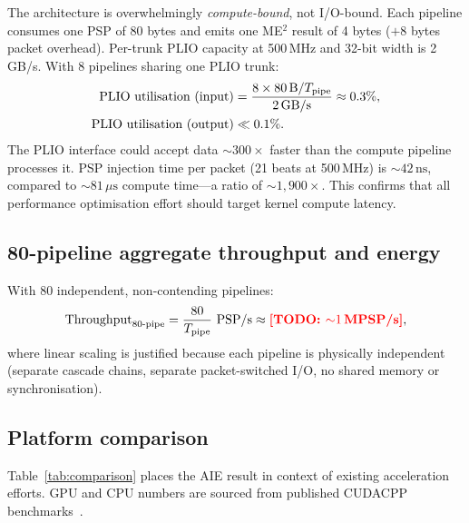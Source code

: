 The architecture is overwhelmingly \emph{compute-bound}, not I/O-bound.  Each
pipeline consumes one PSP of 80 bytes and emits one ME$^2$ result of 4 bytes
($+8$ bytes packet overhead).  Per-trunk PLIO capacity at 500\,MHz and 32-bit
width is 2\,GB/s.  With 8 pipelines sharing one PLIO trunk:
\begin{align}
  \text{PLIO utilisation (input)} &= \frac{8\times 80\,\text{B}/T_\text{pipe}}{2\,\text{GB/s}}
    \approx 0.3\%, \notag \\
  \text{PLIO utilisation (output)} &\ll 0.1\%.
\end{align}
The PLIO interface could accept data ${\sim}300\times$ faster than the
compute pipeline processes it.  PSP injection time per packet (21 beats at
500\,MHz) is ${\sim}42\,\text{ns}$, compared to ${\sim}81\,\mu\text{s}$ compute
time---a ratio of ${\sim}1{,}900\times$.  This confirms that all
performance optimisation effort should target kernel compute latency.

\subsection{80-pipeline aggregate throughput and energy}\label{sec:res_throughput}

With 80 independent, non-contending pipelines:
\begin{equation}
  \text{Throughput}_{\text{80-pipe}}
  = \frac{80}{T_\text{pipe}}\ \text{PSP/s}
  \approx \mathbf{\textcolor{red}{\textbf{[TODO: ${\sim}1\,\text{MPSP/s}$]}}},
  \label{eq:throughput}
\end{equation}
where linear scaling is justified because each pipeline is physically
independent (separate cascade chains, separate packet-switched I/O, no shared
memory or synchronisation).


\subsection{Platform comparison}\label{sec:res_comparison}

Table~\ref{tab:comparison} places the AIE result in context of
existing acceleration efforts.  GPU and CPU numbers are sourced from
published CUDACPP benchmarks~\cite{Valassi:2025xfn}.

